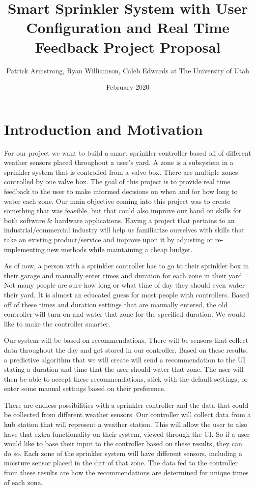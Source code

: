 \documentclass[letterpaper, 10 pt, conference]{ieeeconf}  %
\title{Smart Sprinkler System with User Configuration and Real Time Feedback Project Proposal}
\author{Patrick Armstrong, Ryan Williamson, Caleb Edwards
at The University of Utah}
\date{February 2020}
\begin{document}
\maketitle

\begin{abstract}
    
\end{abstract}

\section{Introduction and Motivation}
For our project we want to build a smart sprinkler controller based off of different weather sensors placed throughout a user's yard. A zone is a subsystem in a sprinkler system that is controlled from a valve box. There are multiple zones controlled by one valve box. The goal of this project is to provide real time feedback to the user to make informed decisions on when and for how long to water each zone. Our main objective coming into this project was to create something that was feasible, but that could also improve our hand on skills for both software \& hardware applications. Having a project that pertains to an industrial/commercial industry will help us familiarize ourselves with skills that take an existing product/service and improve upon it by adjusting or re-implementing new methods while maintaining a cheap budget.

As of now, a person with a sprinkler controller has to go to their sprinkler box in their garage and manually enter times and duration for each zone in their yard. Not many people are sure how long or what time of day they should even water their yard. It is almost an educated guess for most people with controllers. Based off of these times and duration settings that are manually entered, the old controller will turn on and water that zone for the specified duration. We would like to make the controller smarter.

Our system will be based on recommendations. There will be sensors that collect data throughout the day and get stored in our controller. Based on these results, a predictive algorithm that we will create will send a recommendation to the UI stating a duration and time that the user should water that zone. The user will then be able to accept these recommendations, stick with the default settings, or enter some manual settings based on their preference. 

There are endless possibilities with a sprinkler controller and the data that could be collected from different weather sensors. Our controller will collect data from a hub station that will represent a weather station. This will allow the user to also have that extra functionality on their system, viewed through the UI. So if a user would like to base their input to the controller based on these results, they can do so. Each zone of the sprinkler system will have different sensors, including a moisture sensor placed in the dirt of that zone. The data fed to the controller from these results are how the recommendations are determined for unique times of each zone. 
\end{document}
